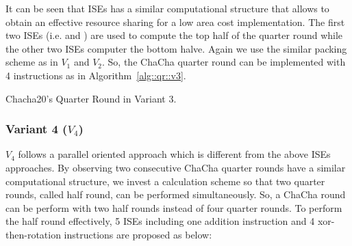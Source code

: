 It can be seen that ISEs has a similar computational structure that allows to obtain an effective resource sharing for a low area cost implementation.
The first two ISEs (i.e.  and ) are used to compute the top half of the quarter round while the other two ISEs computer the bottom halve.
Again we use the similar packing scheme as in $V_1$ and $V_2$. So, the ChaCha quarter round can be implemented with 4 instructions as in Algorithm~\ref{alg::qr::v3}.

\begin{algorithm}
\BlankLine
{}
\caption{Chacha20's Quarter Round in Variant 3.}
\label{alg::qr::v3}
\end{algorithm}


\subsubsection{Variant 4 ($V_4$)}
$V_4$ follows a parallel oriented approach which is different from the above ISEs approaches. By observing two consecutive ChaCha quarter rounds have a similar computational structure, we invest a calculation scheme so that two quarter rounds, called half round, can be performed simultaneously. So, a ChaCha round can be perform with two half rounds instead of four quarter rounds. To perform the half round effectively, 5 ISEs including one addition instruction and 4 xor-then-rotation instructions are proposed as below:     

